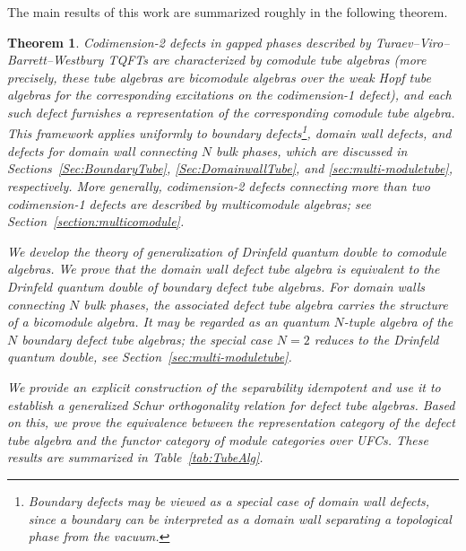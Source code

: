 \documentclass[a4paper,11pt]{article}
\newtheorem{theorem}{Theorem}[section]
\theoremstyle{definition}
\theoremstyle{remark}
\begin{document}
The main results of this work are summarized roughly in the following theorem.

\begin{theorem}
Codimension-2 defects in gapped phases described by Turaev--Viro--Barrett--Westbury TQFTs are characterized by comodule tube algebras (more precisely, these tube algebras are bicomodule algebras over the weak Hopf tube algebras for the corresponding excitations on the codimension-1 defect), and each such defect furnishes a representation of the corresponding comodule tube algebra. This framework applies uniformly to boundary defects\footnote{Boundary defects may be viewed as a special case of domain wall defects, since a boundary can be interpreted as a domain wall separating a topological phase from the vacuum.}, domain wall defects, and defects for domain wall connecting $N$ bulk phases, which are discussed in Sections~\ref{Sec:BoundaryTube}, \ref{Sec:DomainwallTube}, and \ref{sec:multi-moduletube}, respectively. More generally, codimension-2 defects connecting more than two codimension-1 defects are described by multicomodule algebras; see Section~\ref{section:multicomodule}.

We develop the theory of generalization of Drinfeld quantum double to comodule algebras. We prove that the domain wall defect tube algebra is equivalent to the  Drinfeld quantum double of boundary defect tube algebras. For domain walls connecting $N$ bulk phases, the associated defect tube algebra carries the structure of a bicomodule algebra. It may be regarded as an quantum $N$-tuple algebra of the $N$ boundary defect tube algebras; the special case $N=2$ reduces to the Drinfeld quantum double, see Section~\ref{sec:multi-moduletube}. 

We provide an explicit construction of the separability idempotent and use it to establish a generalized Schur orthogonality relation for defect tube algebras. Based on this, we prove the equivalence between the representation category of the defect tube algebra and the functor category of module categories over UFCs. These results are summarized in Table~\ref{tab:TubeAlg}.
\end{theorem}
\end{document}
